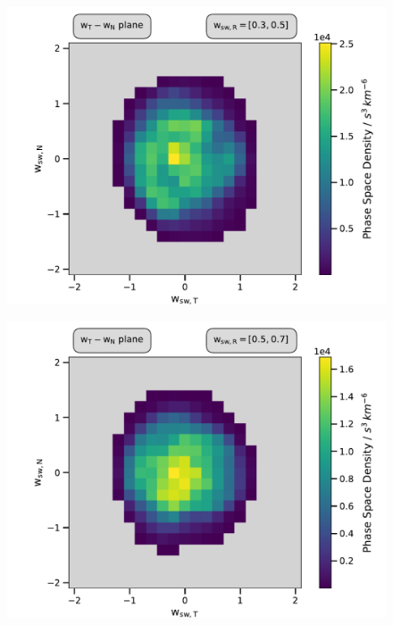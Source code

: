 \begin{figure}[h]
	\includegraphics[width=1.\textwidth]{Figures/slices_50_3.pdf}
\end{figure}

\begin{figure}[h]
	\includegraphics[width=1.\textwidth]{Figures/slices_50_5.pdf}
\end{figure}

